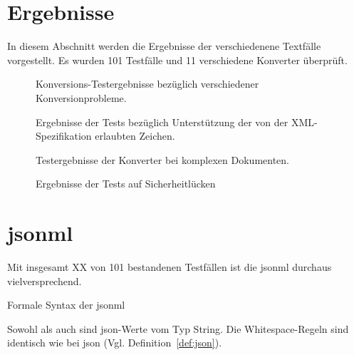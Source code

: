 \chapter{Ergebnisse} \label{chap:results}

In diesem Abschnitt werden die Ergebnisse der verschiedenene Textfälle vorgestellt. Es wurden 101 Testfälle und 11 verschiedene Konverter überprüft.

\begin{figure}[b!]
    \label{fig:results-basic}
    
    \caption{Konversions-Testergebnisse bezüglich verschiedener Konversionprobleme.}
\end{figure}

\begin{figure}[b!]
    \label{fig:results-chars}
    
    \caption{Ergebnisse der Tests bezüglich Unterstützung der von der XML-Spezifikation erlaubten Zeichen.}
\end{figure}

\begin{figure}[b!]
    \label{fig:results-complex}
    
    \caption{Testergebnisse der Konverter bei komplexen Dokumenten.}
\end{figure}

\begin{figure}[b!]
    \label{fig:results-sec}
    
    \caption{Ergebnisse der Tests auf Sicherheitlücken}
\end{figure}


\chapter{\acrfull{jsonml}}

Mit insgesamt XX von 101 bestandenen Testfällen ist die \acrfull{jsonml} durchaus vielversprechend.

\begin{definition}Formale Syntax der \acrfull{jsonml}
\label{def:jsonml}

Sowohl  als auch  sind \acrshort{json}-Werte vom Typ String. Die Whitespace-Regeln sind identisch wie bei \acrshort{json} (Vgl. Definition~\ref{def:json}).

\begin{grammar}
    
\end{grammar}
\end{definition}

